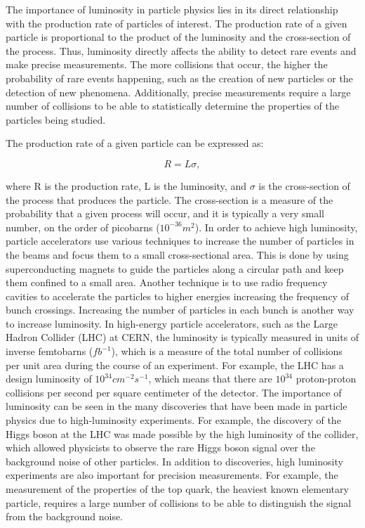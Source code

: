 The importance of luminosity in particle physics lies in its direct relationship with the production rate of particles of interest. The production rate of a given particle is proportional to the product of the luminosity and the cross-section of the process. Thus, luminosity directly affects the ability to detect rare events and make precise measurements. The more collisions that occur, the higher the probability of rare events happening, such as the creation of new particles or the detection of new phenomena. Additionally, precise measurements require a large number of collisions to be able to statistically determine the properties of the particles being studied.

The production rate of a given particle can be expressed as:

\begin{equation}
R = L  \sigma,
\end{equation}

where R is the production rate, L is the luminosity, and $\sigma$ is the cross-section of the process that produces the particle. The cross-section is a measure of the probability that a given process will occur, and it is typically a very small number, on the order of picobarns ($10^{-36} m^2$).
In order to achieve high luminosity, particle accelerators use various techniques to increase the number of particles in the beams and focus them to a small cross-sectional area. This is done by using superconducting magnets to guide the particles along a circular path and keep them confined to a small area. Another technique is to use radio frequency cavities to accelerate the particles to higher energies increasing the frequency of bunch crossings. Increasing the number of particles in each bunch is another way to increase luminosity. In high-energy particle accelerators, such as the Large Hadron Collider (LHC) at CERN, the luminosity is typically measured in units of inverse femtobarns ($fb^{-1}$), which is a measure of the total number of collisions per unit area during the course of an experiment. For example, the LHC has a design luminosity of $10^{34} cm^{-2}s^{-1}$, which means that there are $10^{34}$ proton-proton collisions per second per square centimeter of the detector. The importance of luminosity can be seen in the many discoveries that have been made in particle physics due to high-luminosity experiments. For example, the discovery of the Higgs boson at the LHC was made possible by the high luminosity of the collider, which allowed physicists to observe the rare Higgs boson signal over the background noise of other particles. In addition to discoveries, high luminosity experiments are also important for precision measurements. For example, the measurement of the properties of the top quark, the heaviest known elementary particle, requires a large number of collisions to be able to distinguish the signal from the background noise.


